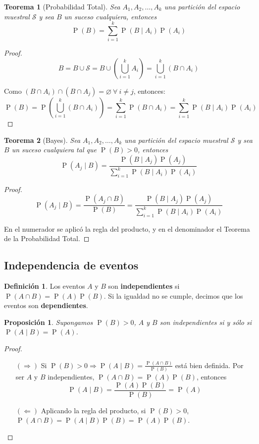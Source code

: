 \documentclass[11pt]{article}
\theoremstyle{plain}
\newtheorem*{teo}{Teorema}
\newtheorem*{pro}{Proposición}
\theoremstyle{definition}
\newtheorem*{defi}{Definición}
\theoremstyle{remark}
\newcommand{\deft}[1]{\textbf{#1}}  %
\newcommand{\proba}{\ensuremath{\operatorname{P}}}  %
\newcommand{\espm}[0]{\ensuremath{\mathcal{S}}}  %
\newcommand{\foralle}{\ensuremath{\forall \ }}  %
\begin{document}
    \begin{teo}[Probabilidad Total]
      Sea $A_1, A_2, \dots, A_k$ una partición del espacio muestral $\espm$ y sea $B$ un suceso cualquiera, entonces
      \[ \proba(B) = \sum_{i=1}^k \proba(B \mid A_i) \proba(A_i) \]
    \end{teo}

    \begin{proof}
      \[ B = B \cup \espm = B \cup \left( \bigcup_{i=1}^k A_i \right) = \bigcup_{i=1}^k (B \cap A_i) \]

      Como $(B \cap A_i) \cap (B \cap A_j) = \varnothing \ \foralle i \neq j$, entonces:
      \[ \proba(B) = \proba \left( \bigcup_{i=1}^k (B \cap A_i) \right) = \sum_{i=1}^k \proba(B \cap A_i) = \sum_{i=1}^k \proba(B \mid A_i) \proba(A_i)\]
    \end{proof}

    \begin{teo}[Bayes]
      Sea $A_1, A_2, \dots, A_k$ una partición del espacio muestral $\espm$ y sea $B$ un suceso cualquiera tal que $\proba(B) > 0$, entonces
      \[ \proba(A_j \mid B) = \frac{\proba(B \mid A_j) \proba(A_j)}{\sum_{i=1}^k \proba(B \mid A_i) \proba(A_i)} \]
    \end{teo}

    \begin{proof}
      \[ \proba(A_j \mid B) = \frac{\proba(A_j \cap B)}{\proba(B)} = \frac{\proba(B \mid A_j) \proba(A_j)}{\sum_{i=1}^k \proba(B \mid A_i) \proba(A_i)} \]

      En el numerador se aplicó la regla del producto, y en el denominador el Teorema de la Probabilidad Total.
    \end{proof}

  \subsection{Independencia de eventos}
    \begin{defi}
      Los eventos $A$ y $B$ son \deft{independientes} si $\proba(A \cap B) = \proba(A) \proba(B)$. Si la igualdad no se cumple, decimos que los eventos son \deft{dependientes}.
    \end{defi}

    \begin{pro}
      Supongamos $\proba(B) > 0$, $A$ y $B$ son independientes si y sólo si $\proba(A \mid B) = \proba(A)$.
    \end{pro}
    \begin{proof} \ 
      \begin{itemize}
        \item[$(\Rightarrow)$] Si $\proba(B) > 0 \Rightarrow \proba(A \mid B) = \frac{\proba(A \cap B)}{\proba(B)}$ está bien definida. Por ser $A$ y $B$ independientes, $\proba(A \cap B) = \proba(A) \proba(B)$, entonces
        \[ \proba(A \mid B) = \frac{\proba(A) \proba(B)}{\proba(B)} = \proba(A) \]
        \item[$(\Leftarrow)$] Aplicando la regla del producto, si $\proba(B) > 0$, $\proba(A \cap B) = \proba(A \mid B) \proba(B) = \proba(A) \proba (B)$.
      \end{itemize}
    \end{proof}
\end{document}
